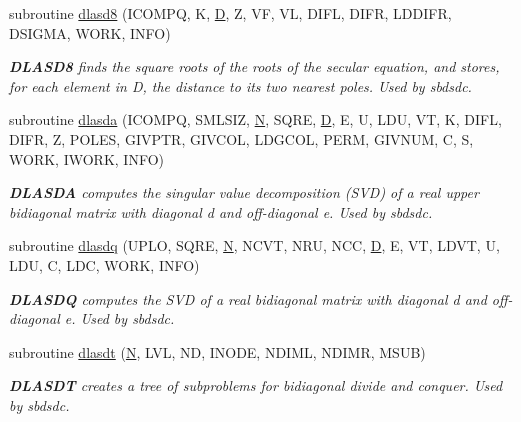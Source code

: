 \begin{DoxyCompactItemize}
subroutine \hyperlink{group__auxOTHERauxiliary_gab80712d01afa9bb687bf87f10d0d2147}{dlasd8} (I\+C\+O\+M\+P\+Q, K, \hyperlink{odrpack_8h_a7dae6ea403d00f3687f24a874e67d139}{D}, Z, V\+F, V\+L, D\+I\+F\+L, D\+I\+F\+R, L\+D\+D\+I\+F\+R, D\+S\+I\+G\+M\+A, W\+O\+R\+K, I\+N\+F\+O)
\begin{DoxyCompactList}\small\item\em {\bfseries D\+L\+A\+S\+D8} finds the square roots of the roots of the secular equation, and stores, for each element in D, the distance to its two nearest poles. Used by sbdsdc. \end{DoxyCompactList}\item 
subroutine \hyperlink{group__auxOTHERauxiliary_gaf8abcba620b2d5a1321889fd86cb3f12}{dlasda} (I\+C\+O\+M\+P\+Q, S\+M\+L\+S\+I\+Z, \hyperlink{polmisc_8c_a0240ac851181b84ac374872dc5434ee4}{N}, S\+Q\+R\+E, \hyperlink{odrpack_8h_a7dae6ea403d00f3687f24a874e67d139}{D}, E, U, L\+D\+U, V\+T, K, D\+I\+F\+L, D\+I\+F\+R, Z, P\+O\+L\+E\+S, G\+I\+V\+P\+T\+R, G\+I\+V\+C\+O\+L, L\+D\+G\+C\+O\+L, P\+E\+R\+M, G\+I\+V\+N\+U\+M, C, S, W\+O\+R\+K, I\+W\+O\+R\+K, I\+N\+F\+O)
\begin{DoxyCompactList}\small\item\em {\bfseries D\+L\+A\+S\+D\+A} computes the singular value decomposition (S\+V\+D) of a real upper bidiagonal matrix with diagonal d and off-\/diagonal e. Used by sbdsdc. \end{DoxyCompactList}\item 
subroutine \hyperlink{group__auxOTHERauxiliary_gafc8e49b5fff31027da26e1856f8a9b25}{dlasdq} (U\+P\+L\+O, S\+Q\+R\+E, \hyperlink{polmisc_8c_a0240ac851181b84ac374872dc5434ee4}{N}, N\+C\+V\+T, N\+R\+U, N\+C\+C, \hyperlink{odrpack_8h_a7dae6ea403d00f3687f24a874e67d139}{D}, E, V\+T, L\+D\+V\+T, U, L\+D\+U, C, L\+D\+C, W\+O\+R\+K, I\+N\+F\+O)
\begin{DoxyCompactList}\small\item\em {\bfseries D\+L\+A\+S\+D\+Q} computes the S\+V\+D of a real bidiagonal matrix with diagonal d and off-\/diagonal e. Used by sbdsdc. \end{DoxyCompactList}\item 
subroutine \hyperlink{group__auxOTHERauxiliary_gab7d5a1edccc56fb53970dd9607fcd5ee}{dlasdt} (\hyperlink{polmisc_8c_a0240ac851181b84ac374872dc5434ee4}{N}, L\+V\+L, N\+D, I\+N\+O\+D\+E, N\+D\+I\+M\+L, N\+D\+I\+M\+R, M\+S\+U\+B)
\begin{DoxyCompactList}\small\item\em {\bfseries D\+L\+A\+S\+D\+T} creates a tree of subproblems for bidiagonal divide and conquer. Used by sbdsdc. \end{DoxyCompactList}\item 

\end{DoxyCompactItemize}
